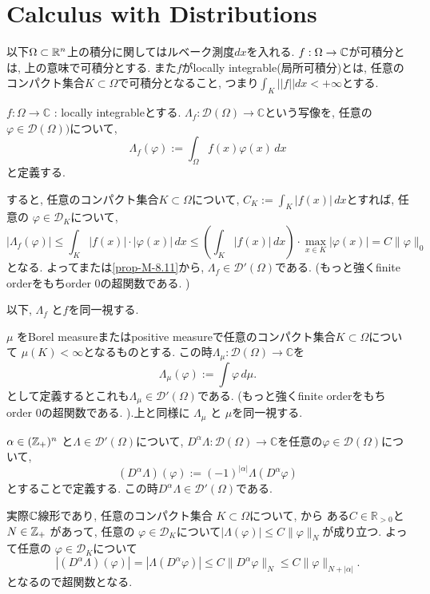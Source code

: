 \section{Calculus with Distributions}
以下$\Omega \subset \mathbb{R}^n$上の積分に関してはルベーク測度$dx$を入れる. 
$f : \Omega \to \mathbb{C}$が可積分とは, 上の意味で可積分とする. 
また$f$がlocally integrable(局所可積分)とは, 任意のコンパクト集合$K \subset \Omega$で可積分となること, つまり$\int_{K}||f|| dx < + \infty$とする. 
\begin{tcolorbox}[mybox]
\begin{defn}{\cite[6.11]{Rud}}
\label{defn-H-1}
\(f : \Omega \to \mathbb{C}\) : locally integrableとする. 
\(\Lambda_f : \mathcal{D}(\Omega) \to \mathbb{C}\)という写像を, 
任意の$\varphi \in \mathcal{D}(\Omega))$について, 
\[
\Lambda_f(\varphi) := \int_\Omega f(x) \varphi(x) \, dx
\]
と定義する. 

すると, 任意のコンパクト集合\(K \subset \Omega\)について, 
\(C_K := \int_K |f(x)| \, dx\)とすれば, 任意の 
\(\varphi \in \mathcal{D}_K\)について, 
\[
|\Lambda_f(\varphi)| \le \int_K |f(x)| \cdot |\varphi(x)| \, dx \le \left( \int_K |f(x)| \, dx \right) \cdot \max_{x \in K} |\varphi(x)| = C \|\varphi\|_{0}
\]
となる. よって\cite[Theorem 6.8]{Rud}または\ref{prop-M-8.11}から,  \(\Lambda_f \in \mathcal{D}'(\Omega)\)である. (もっと強くfinite orderをもちorder 0の超関数である. )
\end{defn}
\end{tcolorbox}

以下, \(\Lambda_f\) と\(f\)を同一視する. 

\begin{rem}
 \(\mu\) をBorel measureまたはpositive measureで任意のコンパクト集合$K \subset \Omega$について
\(\mu(K) < \infty\)となるものとする. 
この時\(\Lambda_\mu : \mathcal{D}(\Omega) \to \mathbb{C}\)を
\[
\Lambda_\mu(\varphi) := \int \varphi \, d\mu.
\]
として定義するとこれも\(\Lambda_\mu \in \mathcal{D}'(\Omega)\)である. (もっと強くfinite orderをもちorder 0の超関数である. ).上と同様に \(\Lambda_\mu\) と \(\mu\)を同一視する.
\end{rem}



\begin{tcolorbox}[mybox]
\begin{defn}{\cite[6.12]{Rud}}
\label{defn-H-3}
\(\alpha \in (\mathbb{Z}_+)^n\) と\(\Lambda \in \mathcal{D}'(\Omega)\)について,  
\(D^\alpha \Lambda : \mathcal{D}(\Omega) \to \mathbb{C}\)を任意の$\varphi \in \mathcal{D}(\Omega)$について, 
\[
(D^\alpha \Lambda)(\varphi) := (-1)^{|\alpha|} \Lambda(D^\alpha \varphi) 
\]
とすることで定義する. この時\(D^\alpha \Lambda \in \mathcal{D}'(\Omega)\)である.
 
実際$\mathbb{C}$線形であり, 任意のコンパクト集合 \(K \subset \Omega\)について, \cite[Theorem 6.8]{Rud}から
ある\(C \in \mathbb{R}_{>0}\)と\(N \in \mathbb{Z}_+\) があって, 任意の \(\varphi \in \mathcal{D}_K\)について\(|\Lambda(\varphi)| \le C \|\varphi\|_N\)が成り立つ. よって任意の \(\varphi \in \mathcal{D}_K\)について
\[
|(D^\alpha \Lambda)(\varphi)| = |\Lambda(D^\alpha \varphi)| \le C \|D^\alpha \varphi\|_N \le C \|\varphi\|_{N + |\alpha|}.
\]
となるので超関数となる. 
\end{defn}
\end{tcolorbox}

